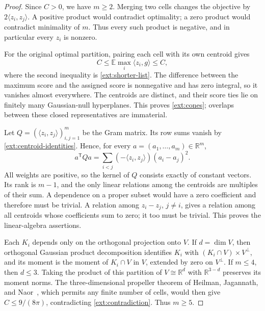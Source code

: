 \begin{proof}
Since $C>0$, we have $m\ge2$. Merging two cells changes the objective by
$2\langle z_i,z_j\rangle$. A positive product would contradict optimality;
a zero product would contradict minimality of $m$. Thus every such
product is negative, and in particular every $z_i$ is nonzero.

For the original optimal partition, pairing each cell with its own
centroid gives
\[
 C\le\mathbb E\max_i\langle z_i,g\rangle\le C,
\]
where the second inequality is \eqref{ext:shorter-list}.
The difference between the maximum score and the assigned score is
nonnegative and has zero integral, so it vanishes almost everywhere.
The centroids are distinct, and their score ties lie on finitely many
Gaussian-null hyperplanes. This proves \eqref{ext:cones}; overlaps
between these closed representatives are immaterial.

Let $Q=(\langle z_i,z_j\rangle)_{i,j=1}^m$ be the Gram matrix.
Its row sums vanish by \eqref{ext:centroid-identities}. Hence, for every
$a=(a_1,\ldots,a_m)\in\mathbb R^m$,
\begin{equation}\label{ext:laplacian}
 a^{\mathsf T}Qa
 =\sum_{i<j}(-\langle z_i,z_j\rangle)(a_i-a_j)^2.
\end{equation}
All weights are positive, so the kernel of $Q$ consists exactly of
constant vectors. Its rank is $m-1$, and the only linear relations among
the centroids are multiples of their sum. A dependence on a proper
subset would have a zero coefficient and therefore must be trivial.
A relation among $z_i-z_j$, $j\ne i$, gives a relation among all centroids
whose coefficients sum to zero; it too must be trivial. This proves
the linear-algebra assertions.

Each $K_i$ depends only on the orthogonal projection onto $V$.
If $d=\dim V$, then orthogonal Gaussian product decomposition identifies
$K_i$ with $(K_i\cap V)\times V^\perp$, and its moment is the moment of
$K_i\cap V$ in $V$, extended by zero on $V^\perp$.
If $m\le4$, then $d\le3$. Taking the product of this partition of
$V\cong\mathbb R^d$ with $\mathbb R^{3-d}$ preserves its moment norms.
The three-dimensional propeller theorem of Heilman, Jagannath, and
Naor~\cite[Theorem~1.1]{HJN}, which permits any finite number of cells,
would then give $C\le9/(8\pi)$, contradicting
\eqref{ext:contradiction}. Thus $m\ge5$.
\end{proof}

